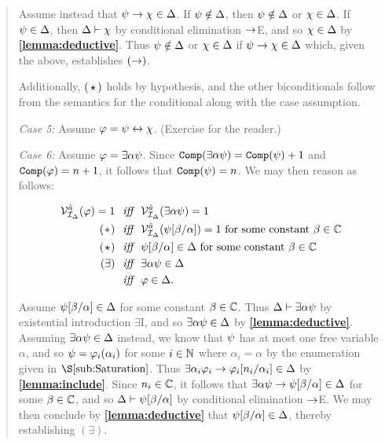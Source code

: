 \begin{quote}
  Assume instead that $\psi\rightarrow\chi\in\Delta$.
  If $\psi\notin\Delta$, then $\psi\notin\Delta$ or $\chi\in\Delta$.
  If $\psi\in\Delta$, then $\Delta\vdash\chi$ by conditional elimination $\rightarrow$E, and so $\chi\in\Delta$ by \textbf{\ref{lemma:deductive}}.
  Thus $\psi\notin\Delta$ or $\chi\in\Delta$ if $\psi\rightarrow\chi\in\Delta$ which, given the above, establishes $(\rightarrow)$.  

  Additionally, $(\hspace{1.6pt}\star\hspace{1.6pt})$ holds by hypothesis, and the other biconditionals follow from the semantics for the conditional along with the case assumption.

  \textit{Case 5:}
  Assume $\varphi=\psi\leftrightarrow\chi$. (Exercise for the reader.)

  \textit{Case 6:}
  Assume $\varphi=\exists \alpha\psi$.
  Since $\texttt{Comp}(\exists \alpha\psi)=\texttt{Comp}(\psi)+1$ and $\texttt{Comp}(\varphi)=n+1$, it follows that $\texttt{Comp}(\psi)=n$.
  We may then reason as follows:

  \vspace{-.2in}
  \begin{align*}
    \mathcal{V}_{\mathcal{I}_{\Delta}}^{\hat{a}}(\varphi)=1 &\textit{ ~iff~ } \mathcal{V}_{\mathcal{I}_{\Delta}}^{\hat{a}}(\exists \alpha\psi)=1\\
      (\hspace{.7pt}\ast\hspace{.7pt}) &\textit{ ~iff~ } \mathcal{V}_{\mathcal{I}_{\Delta}}^{\hat{a}}(\psi[\beta/\alpha])=1 \text{ for some constant } \beta\in\mathbb{C}\\
      (\hspace{.7pt}\star\hspace{.7pt}) &\textit{ ~iff~ } \psi[\beta/\alpha]\in\Delta \text{ for some constant } \beta\in\mathbb{C}\\ 
      (\exists) &\textit{ ~iff~ } \exists \alpha\psi\in\Delta \\
      &\textit{ ~iff~ } \varphi\in\Delta.
  \end{align*}

  Assume $\psi[\beta/\alpha]\in\Delta$ for some constant $\beta\in\mathbb{C}$.
  Thus $\Delta\vdash \exists \alpha\psi$ by existential introduction $\exists$I, and so $\exists \alpha\psi\in\Delta$ by \textbf{\ref{lemma:deductive}}.
  Assuming $\exists \alpha\psi\in\Delta$ instead, we know that $\psi$ has at most one free variable $\alpha$, and so $\psi=\varphi_i(\alpha_i)$ for some $i\in\mathbb{N}$ where $\alpha_i=\alpha$ by the enumeration given in $\S\ref{sub:Saturation}$.
  Thus $\exists \alpha_i\varphi_i\rightarrow \varphi_i[n_i/\alpha_i]\in\Delta$ by \textbf{\ref{lemma:include}}.
  Since $n_i\in\mathbb{C}$, it follows that $\exists \alpha\psi\rightarrow\psi[\beta/\alpha]\in\Delta$ for some $\beta\in\mathbb{C}$, and so $\Delta\vdash\psi[\beta/\alpha]$ by conditional elimination $\rightarrow$E. 
  We may then conclude by \textbf{\ref{lemma:deductive}} that $\psi[\beta/\alpha]\in\Delta$, thereby establishing $(\exists)$.


\end{quote}
